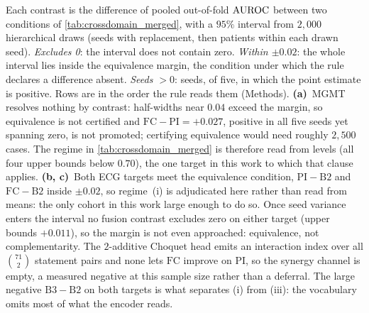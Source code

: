 \begin{flushleft}\footnotesize
Each contrast is the difference of pooled out-of-fold $\text{AUROC}$ between two
conditions of \cref{tab:crossdomain_merged}, with a $95\%$ interval from
$2{,}000$ hierarchical draws (seeds with replacement, then patients within
each drawn seed). \emph{Excludes 0}: the interval does not contain zero.
\emph{Within $\pm0.02$}: the whole interval lies inside the equivalence
margin, the condition under which the rule declares a difference absent.
\emph{Seeds $>0$}: seeds, of five, in which the point estimate is
positive. Rows are in the order the rule reads them (Methods).
\textbf{(a)}~MGMT resolves nothing by contrast: half-widths near $0.04$
exceed the margin, so equivalence is not certified and
$\mathrm{FC}-\mathrm{PI}=+0.027$, positive in all five seeds yet spanning
zero, is not promoted; certifying equivalence would need roughly
$2{,}500$ cases. The regime in \cref{tab:crossdomain_merged} is therefore
read from levels (all four upper bounds below $0.70$), the one target in
this work to which that clause applies.
\textbf{(b, c)}~Both ECG targets meet the equivalence condition,
$\mathrm{PI}-\mathrm{B2}$ and $\mathrm{FC}-\mathrm{B2}$ inside $\pm0.02$,
so regime~(i) is adjudicated here rather than read from means: the only
cohort in this work large enough to do so. Once seed variance enters the
interval no fusion contrast excludes zero on either target (upper bounds
$+0.011$), so the margin is not even approached: equivalence, not
complementarity. The $2$-additive Choquet head emits an interaction index
over all $\binom{71}{2}$ statement pairs and none lets $\mathrm{FC}$
improve on $\mathrm{PI}$, so the synergy channel is empty, a measured
negative at this sample size rather than a deferral. The large negative
$\mathrm{B3}-\mathrm{B2}$ on both targets is what separates (i) from
(iii): the vocabulary omits most of what the encoder reads.
\end{flushleft}
